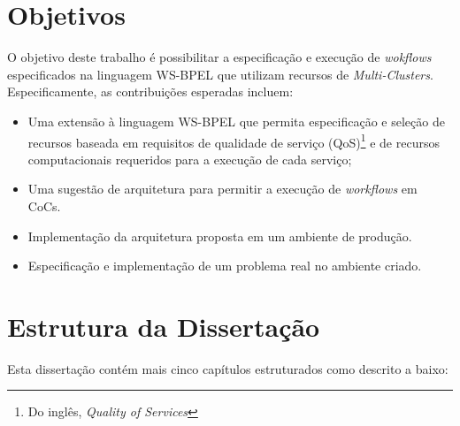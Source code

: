 \documentclass[12pt]{report} %
\begin{document}
    \section{Objetivos}
	O objetivo deste trabalho é possibilitar a especificação e execução de \textit{wokflows} especificados na linguagem WS-BPEL que utilizam recursos de \textit{Multi-Clusters}.
	Especificamente, as contribuições esperadas incluem: 
	\begin{itemize}
	 \item Uma extensão à linguagem WS-BPEL que permita especificação e seleção de recursos baseada em requisitos de qualidade de serviço (QoS)\footnote{Do inglês, \textit{Quality of Services}} e de recursos computacionais requeridos para a execução de cada serviço;
	 \item Uma sugestão de arquitetura para permitir a execução de \textit{workflows} em CoCs.
	 \item Implementação da arquitetura proposta em um ambiente de produção.
	 \item Especificação e implementação de um problema real no ambiente criado.
	\end{itemize}		
	


    \section{Estrutura da Dissertação}    
	Esta dissertação contém mais cinco capítulos estruturados como descrito a baixo:
	
\end{document}
